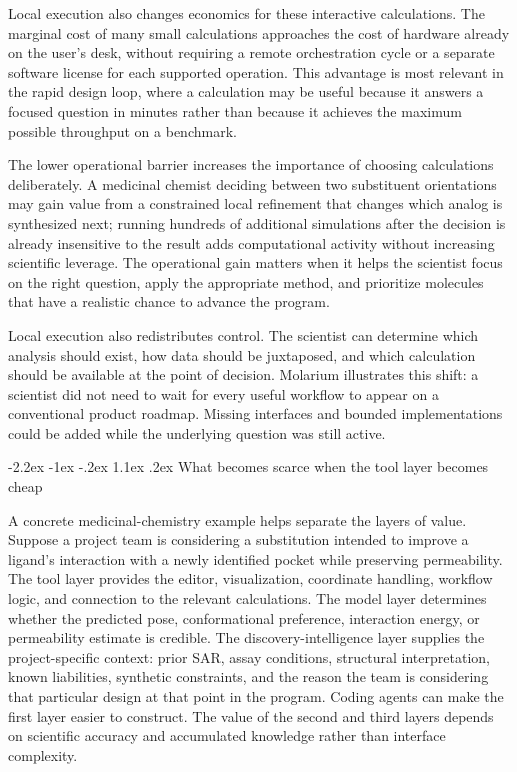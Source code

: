 \documentclass[11pt]{article}
\makeatletter
\renewcommand\section{\@startsection{section}{1}{\z@}%
  {-2.2ex \@plus -1ex \@minus -.2ex}%
  {1.1ex \@plus .2ex}%
  {\normalfont\Large\bfseries\color{molblue}}}
\makeatother
\begin{document}
Local execution also changes economics for these interactive calculations. The marginal cost of many small calculations approaches the cost of hardware already on the user's desk, without requiring a remote orchestration cycle or a separate software license for each supported operation. This advantage is most relevant in the rapid design loop, where a calculation may be useful because it answers a focused question in minutes rather than because it achieves the maximum possible throughput on a benchmark.

The lower operational barrier increases the importance of choosing calculations deliberately. A medicinal chemist deciding between two substituent orientations may gain value from a constrained local refinement that changes which analog is synthesized next; running hundreds of additional simulations after the decision is already insensitive to the result adds computational activity without increasing scientific leverage. The operational gain matters when it helps the scientist focus on the right question, apply the appropriate method, and prioritize molecules that have a realistic chance to advance the program.

Local execution also redistributes control. The scientist can determine which analysis should exist, how data should be juxtaposed, and which calculation should be available at the point of decision. Molarium illustrates this shift: a scientist did not need to wait for every useful workflow to appear on a conventional product roadmap. Missing interfaces and bounded implementations could be added while the underlying question was still active.

\section{What becomes scarce when the tool layer becomes cheap}

A concrete medicinal-chemistry example helps separate the layers of value. Suppose a project team is considering a substitution intended to improve a ligand's interaction with a newly identified pocket while preserving permeability. The tool layer provides the editor, visualization, coordinate handling, workflow logic, and connection to the relevant calculations. The model layer determines whether the predicted pose, conformational preference, interaction energy, or permeability estimate is credible. The discovery-intelligence layer supplies the project-specific context: prior SAR, assay conditions, structural interpretation, known liabilities, synthetic constraints, and the reason the team is considering that particular design at that point in the program. Coding agents can make the first layer easier to construct. The value of the second and third layers depends on scientific accuracy and accumulated knowledge rather than interface complexity.
\end{document}
